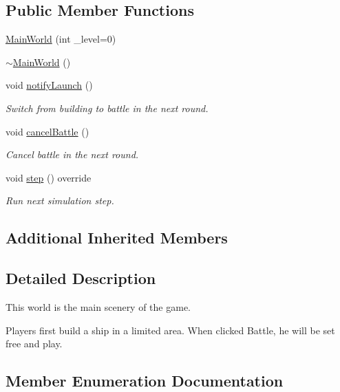 \subsection*{Public Member Functions}
\begin{DoxyCompactItemize}
\item 
\hyperlink{classMainWorld_a46e56e826f563bf0255ad7e44944d286}{Main\+World} (int \+\_\+level=0)
\item 
\hyperlink{classMainWorld_ace9d329c017b003879831dcd8295cfe0}{$\sim$\+Main\+World} ()
\item 
void \hyperlink{classMainWorld_a7b7a15580a43911c7252d179b320bddd}{notify\+Launch} ()
\begin{DoxyCompactList}\small\item\em Switch from building to battle in the next round. \end{DoxyCompactList}\item 
void \hyperlink{classMainWorld_a223280718d44259c485fbbaaf74c34e5}{cancel\+Battle} ()
\begin{DoxyCompactList}\small\item\em Cancel battle in the next round. \end{DoxyCompactList}\item 
void \hyperlink{classMainWorld_a8ac7fe4b17bb3ca29a0382b93a24731e}{step} () override
\begin{DoxyCompactList}\small\item\em Run next simulation step. \end{DoxyCompactList}\end{DoxyCompactItemize}
\subsection*{Additional Inherited Members}


\subsection{Detailed Description}
This world is the main scenery of the game. 

Players first build a ship in a limited area. When clicked Battle, he will be set free and play. 

\subsection{Member Enumeration Documentation}
\hypertarget{classMainWorld_ab0b1d1d54026f907ddc7fcc858ea48f3}{}
